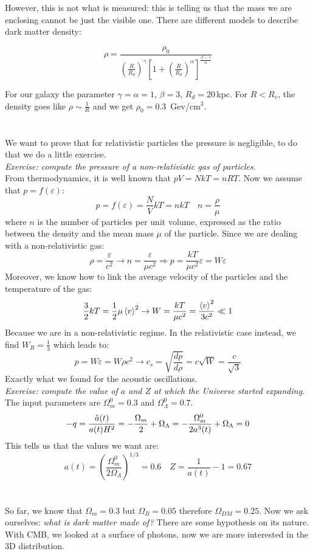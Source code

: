 \documentclass[10.75pt,a4paper,openright,bottom=2cm]{article}
\newcommand{\beginbox}[1]{\begin{tcolorbox}[width=\textwidth,colback={black!40},title={#1},colbacktitle={purple!55},coltitle=black]}
\renewcommand{\endbox}{\end{tcolorbox}\noindent}
\begin{document}
However, this is not what is measured: this is telling us that the mass we are enclosing cannot be just the visible one. There are different models to describe dark matter density:
\beginbox{Navarro-Frank-White Model}
\[
\rho=\frac{\rho_0}{\left(\frac{R}{R_d}\right)^\gamma\left[1+\left(\frac{R}{R_d}\right)^\alpha\right]^{\frac{\beta-\gamma}{\alpha}}}
\]
\endbox
For our galaxy the parameter $\gamma=\alpha=1$, $\beta=3$, $R_d=20$\,kpc. For $R<R_v$, the density goes like $\rho\sim\frac{1}{R}$ and we get $\rho_0=0.3$\, Gev/cm$^3$.\\
\hline\\
\noindent\\
We want to prove that for relativistic particles the pressure is negligible, to do that we do a little exercise.\\
\textit{Exercise: compute the pressure of a non-relativistic gas of particles.}\\
From thermodynamics, it is well known that $pV=NkT=nRT$. Now we assume that $p=f(\varepsilon)$:
\[
p=f(\varepsilon)=\frac{N}{V}kT=nkT \quad n=\frac{\rho}{\mu}
\]
where $n$ is the number of particles per unit volume, expressed as the ratio between the density and the mean mass $\mu$ of the particle. Since we are dealing with a non-relativistic gas:
\[
\rho=\frac{\varepsilon}{c^2}\to n=\frac{\varepsilon}{\mu c^2}\Rightarrow p=\frac{kT}{\mu c^2}\varepsilon=W\varepsilon
\]
Moreover, we know how to link the average velocity of the particles and the temperature of the gas:
\[
\frac{3}{2}kT=\frac{1}{2}\mu\Braket{v}^2\to W=\frac{kT}{\mu c^2}=\frac{\Braket{v}^2}{3c^2}\ll1
\]
Because we are in a non-relativistic regime. In the relativistic case instead, we find $W_R=\frac{1}{3}$ which leads to:
\[
p=W\varepsilon=W\rho c^2\to c_s=\sqrt{\frac{dp}{d\rho}}=c\sqrt{W}=\frac{c}{\sqrt{3}}
\]
Exactly what we found for the acoustic oscillations.\\
\textit{Exercise: compute the value of $a$ and $Z$ at which the Universe started expanding.}\\
The input parameters are $\Omega_m^0=0.3$ and $\Omega_\Lambda^0=0.7$.
\[
-q=\frac{\Ddot{a}(t)}{a(t)H^2}=-\frac{\Omega_m}{2}+\Omega_\Lambda=-\frac{\Omega_m^0}{2a^3(t)}+\Omega_\Lambda=0
\]
This tells us that the values we want are:
\[
a(t)=\left(\frac{\Omega_m^0}{2\Omega_\Lambda}\right)^{1/3}=0.6 \quad Z=\frac{1}{a(t)}-1=0.67
\]
\hline\\
\noindent\\
So far, we know that $\Omega_m=0.3$ but $\Omega_B=0.05$ therefore $\Omega_{DM}=0.25$. Now we ask ourselves: \textit{what is dark matter made of?} There are some hypothesis on its nature. With CMB, we looked at a surface of photons, now we are more interested in the 3D distribution. 
\end{document}
